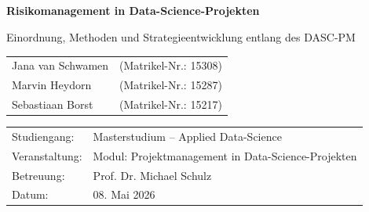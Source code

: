 \documentclass[
  12pt,
  a4paper,
  oneside,
  headings=big,
  parskip=half,
  bibliography=totoc,
  listof=totoc
]{scrreprt}
\title{\thesistitle\\\large \thesissubtitle}
\author{\thesisauthor}
\date{\thesisdate}
\newcommand{\thesistitle}{Risikomanagement in Data-Science-Projekten}
\newcommand{\thesissubtitle}{Einordnung, Methoden und Strategieentwicklung entlang des DASC-PM}
\newcommand{\authorA}{Jana van Schwamen}
\newcommand{\matrikelA}{15308}
\newcommand{\authorB}{Marvin Heydorn}
\newcommand{\matrikelB}{15287}
\newcommand{\authorC}{Sebastiaan Borst}
\newcommand{\matrikelC}{15217}
\newcommand{\thesisprogram}{Masterstudium -- Applied Data-Science}
\newcommand{\thesiscourse}{Modul: Projektmanagement in Data-Science-Projekten}
\newcommand{\thesissupervisor}{Prof. Dr. Michael Schulz}
\newcommand{\thesisdate}{08. Mai 2026}
\begin{document}
\raggedbottom


\begin{titlepage}
  \centering
  \vspace*{2cm}

  {\LARGE\bfseries \thesistitle\par}
  \vspace{0.5cm}
  {\Large \thesissubtitle\par}

  \vspace{1.5cm}
  \begin{tabular}{@{}ll@{}}
    \authorA & (Matrikel-Nr.: \matrikelA) \\[2pt]
    \authorB & (Matrikel-Nr.: \matrikelB) \\[2pt]
    \authorC & (Matrikel-Nr.: \matrikelC) \\
  \end{tabular}
  \par

  \vfill

  \begin{tabular}{@{}ll@{}}
    Studiengang: & \thesisprogram\\
    Veranstaltung: & \thesiscourse\\
    Betreuung: & \thesissupervisor\\
    Datum: & \thesisdate\\
  \end{tabular}

  \vspace*{2cm}
\end{titlepage}



\clearpage
\tableofcontents    %
\listoftables       %
\listoffigures      %
\clearpage


\clearpage


\clearpage
{}
\setcounter{page}{1}









\clearpage
{}



\clearpage
{}
{}

\end{document}
